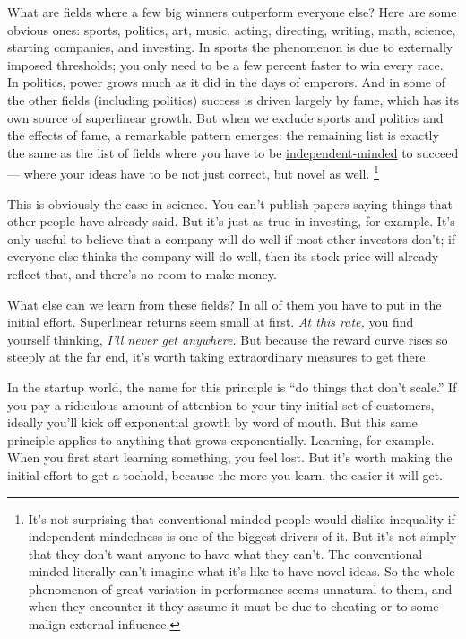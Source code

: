 What are fields where a few big winners outperform everyone else? Here
are some obvious ones: sports, politics, art, music, acting, directing,
writing, math, science, starting companies, and investing. In sports the
phenomenon is due to externally imposed thresholds; you only need to be
a few percent faster to win every race. In politics, power grows much as
it did in the days of emperors. And in some of the other fields
(including politics) success is driven largely by fame, which has its
own source of superlinear growth. But when we exclude sports and
politics and the effects of fame, a remarkable pattern emerges: the
remaining list is exactly the same as the list of fields where you have
to be \href{think.html}{independent-minded} to succeed --- where your
ideas have to be not just correct, but novel as well.
\footnote{It's not surprising that conventional-minded people would
dislike inequality if independent-mindedness is one of the biggest
drivers of it. But it's not simply that they don't want anyone to have
what they can't. The conventional-minded literally can't imagine what
it's like to have novel ideas. So the whole phenomenon of great
variation in performance seems unnatural to them, and when they
encounter it they assume it must be due to cheating or to some malign
external influence.}

This is obviously the case in science. You can't publish papers saying
things that other people have already said. But it's just as true in
investing, for example. It's only useful to believe that a company will
do well if most other investors don't; if everyone else thinks the
company will do well, then its stock price will already reflect that,
and there's no room to make money.

What else can we learn from these fields? In all of them you have to put
in the initial effort. Superlinear returns seem small at first. \emph{At
this rate,} you find yourself thinking, \emph{I'll never get anywhere.}
But because the reward curve rises so steeply at the far end, it's worth
taking extraordinary measures to get there.

In the startup world, the name for this principle is ``do things that
don't scale.'' If you pay a ridiculous amount of attention to your tiny
initial set of customers, ideally you'll kick off exponential growth by
word of mouth. But this same principle applies to anything that grows
exponentially. Learning, for example. When you first start learning
something, you feel lost. But it's worth making the initial effort to
get a toehold, because the more you learn, the easier it will get.

